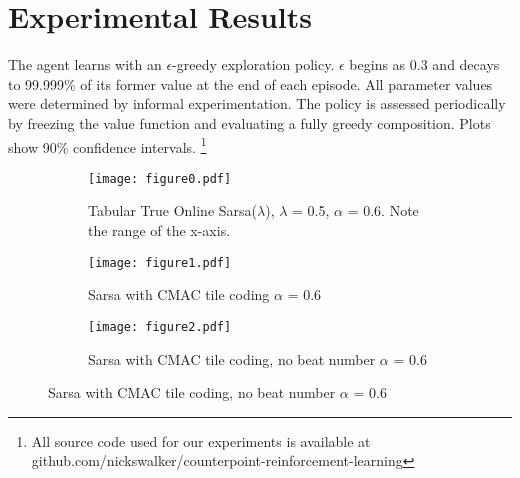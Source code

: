 \documentclass{article}
\begin{document}
	\section{Experimental Results}

    The agent learns with an $\epsilon$-greedy exploration policy. $\epsilon$ begins as 0.3 and decays to 99.999\% of its former value at the end of each episode. All parameter values were determined by informal experimentation. The policy is assessed periodically by freezing the value function and evaluating a fully greedy composition. Plots show 90\% confidence intervals. \footnote{All source code used for our experiments is available at github.com/nickswalker/counterpoint-reinforcement-learning}
    
   	\begin{figure}
        \begin{subfigure}{\linewidth}
            \texttt{[image: figure0.pdf]}
            \caption{Tabular True Online Sarsa($\lambda$), $\lambda$ = 0.5, $\alpha$ = 0.6. Note the range of the x-axis.}
                    \vspace{1cm}
        \end{subfigure}
        
        \begin{subfigure}{\linewidth}
            \texttt{[image: figure1.pdf]}
            \caption{Sarsa with CMAC tile coding $\alpha$ = 0.6}
                    \vspace{1cm}
        \end{subfigure}
        
        \begin{subfigure}{\linewidth}
            \texttt{[image: figure2.pdf]}
            \caption{Sarsa with CMAC tile coding, no beat number $\alpha$ = 0.6}
                    \vspace{1cm}
        \end{subfigure}
    \end{figure}
        
\end{document}
